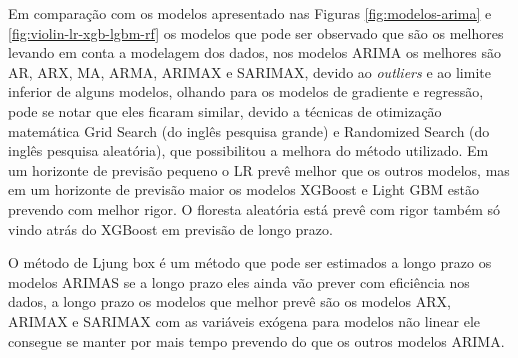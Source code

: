 Em comparação com os modelos apresentado nas Figuras \ref{fig:modelos-arima} e \ref{fig:violin-lr-xgb-lgbm-rf} os modelos que pode ser observado que são os melhores levando em conta a modelagem dos dados, nos modelos ARIMA os melhores são AR, ARX, MA, ARMA, ARIMAX e SARIMAX, devido ao \textit{outliers} e ao limite inferior de alguns modelos, olhando para os modelos de gradiente e regressão, pode se notar que eles ficaram similar, devido a técnicas de otimização matemática Grid Search (do inglês pesquisa grande) e Randomized Search (do inglês pesquisa aleatória), que possibilitou a melhora do método utilizado. Em um horizonte de previsão pequeno o LR prevê melhor que os outros modelos, mas em um horizonte de previsão maior os modelos XGBoost e Light GBM estão prevendo com melhor rigor. O floresta aleatória está prevê com rigor também só vindo atrás do XGBoost em previsão de longo prazo.

O método de Ljung box é um método que pode ser estimados a longo prazo os modelos ARIMAS se a longo prazo eles ainda vão prever com eficiência nos dados, a longo prazo os modelos que melhor prevê são os modelos ARX, ARIMAX e SARIMAX com as variáveis exógena para modelos não linear ele consegue se manter por mais tempo prevendo do que os outros modelos ARIMA.  
 
  
    

    
